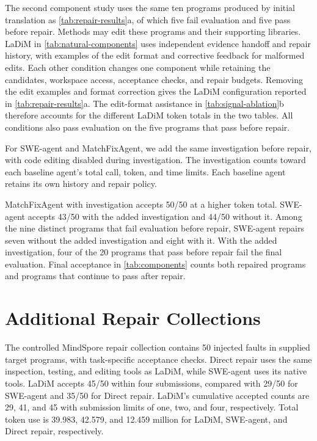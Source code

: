 The second component study uses the same ten programs produced by initial translation as \cref{tab:repair-results}a, of which five fail evaluation and five pass before repair. Methods may edit these programs and their supporting libraries. LaDiM in \cref{tab:natural-components} uses independent evidence handoff and repair history, with examples of the edit format and corrective feedback for malformed edits. Each other condition changes one component while retaining the candidates, workspace access, acceptance checks, and repair budgets. Removing the edit examples and format correction gives the LaDiM configuration reported in \cref{tab:repair-results}a. The edit-format assistance in \cref{tab:signal-ablation}b therefore accounts for the different LaDiM token totals in the two tables. All conditions also pass evaluation on the five programs that pass before repair.
\begin{table}[!htb]
\caption{Complete component results on ten programs produced by initial translation. Repaired counts failed programs corrected, and Preserved counts passing programs that remain accepted. Tokens are in millions and cover investigation and repair on all ten programs, including failed attempts.}
\label{tab:natural-components}
\centering
\small
\setlength{\tabcolsep}{3pt}

\end{table}
For SWE-agent and MatchFixAgent, we add the same investigation before repair, with code editing disabled during investigation. The investigation counts toward each baseline agent's total call, token, and time limits. Each baseline agent retains its own history and repair policy.

MatchFixAgent with investigation accepts 50/50 at a higher token total. SWE-agent accepts 43/50 with the added investigation and 44/50 without it. Among the nine distinct programs that fail evaluation before repair, SWE-agent repairs seven without the added investigation and eight with it. With the added investigation, four of the 20 programs that pass before repair fail the final evaluation. Final acceptance in \cref{tab:components} counts both repaired programs and programs that continue to pass after repair.

\section{Additional Repair Collections}
\label{sec:additional-repair}
The controlled MindSpore repair collection contains 50 injected faults in supplied target programs, with task-specific acceptance checks. Direct repair uses the same inspection, testing, and editing tools as LaDiM, while SWE-agent uses its native tools. LaDiM accepts 45/50 within four submissions, compared with 29/50 for SWE-agent and 35/50 for Direct repair. LaDiM's cumulative accepted counts are 29, 41, and 45 with submission limits of one, two, and four, respectively. Total token use is 39.983, 42.579, and 12.459 million for LaDiM, SWE-agent, and Direct repair, respectively.

